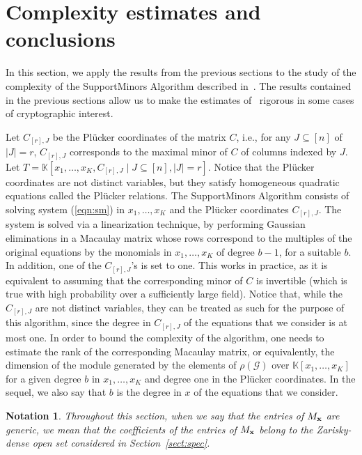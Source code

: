 \documentclass[utf8,latin1]{article}
\newtheorem{notation}[theorem]{Notation}
\newcommand{\KK}{\mathbb{K}}
\begin{document}
\section{Complexity estimates and conclusions}\label{sect:estimates}

In this section, we apply the results from the previous sections to the study of the complexity of the SupportMinors Algorithm described in~\cite[Sections 5.2 and 5.3]{BBCGPSTV20}. The results contained in the previous sections allow us to make the estimates of~\cite[Sections 5.2 and 5.3]{BBCGPSTV20} rigorous in some cases of cryptographic interest.

Let $C_{[r],J}$ be the Pl\"ucker coordinates of the matrix $C$, i.e., for any $J\subseteq [n]$ of $|J|=r$, $C_{[r],J}$ corresponds to the maximal minor of $C$ of columns indexed by $J$. Let $T=\KK[x_1,\ldots,x_K,C_{[r],J}\mid J\subseteq[n], |J|=r]$. Notice that the Pl\"ucker coordinates are not distinct variables, but they satisfy homogeneous quadratic equations called the Pl\"ucker relations.
The SupportMinors Algorithm consists of solving system (\ref{eqn:sm}) in $x_1,\ldots,x_K$ and the Pl\"ucker coordinates $C_{[r],J}$. The system is solved via a linearization technique, by performing Gaussian eliminations in a Macaulay matrix whose rows correspond to the multiples of the original equations by the monomials in $x_1,\ldots,x_K$ of degree $b-1$, for a suitable $b$. In addition, one of the $C_{[r],J}$'s is set to one. This works in practice, as it is equivalent to assuming that the corresponding minor of $C$ is invertible (which is true with high probability over a sufficiently large field). Notice that, while the $C_{[r],J}$ are not distinct variables, they can be treated as such for the purpose of this algorithm, since the degree in $C_{[r],J}$ of the equations that we consider is at most one.
In order to bound the complexity of the algorithm, one needs to estimate the rank of the corresponding  Macaulay matrix, or equivalently, the dimension of the module generated by the elements of $\mathcal{\rho(G)}$ over $\KK[x_1,\ldots,x_K]$ for a given degree $b$ in $x_1,\ldots,x_K$ and degree one in the Pl\"ucker coordinates. In the sequel, we also say that $b$ is the degree in $x$ of the equations that we consider. 

\begin{notation}
Throughout this section, when we say that the entries of $M_{\bf x}$ are generic, we mean that the coefficients of the entries of $M_{\bf x}$ belong to the Zarisky-dense open set considered in Section~\ref{sect:spec}.
\end{notation}
\end{document}
